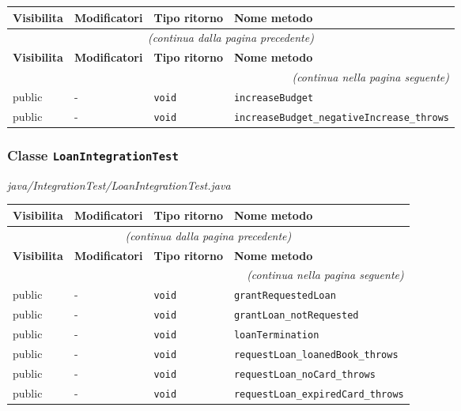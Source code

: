 \begin{longtable}{@{}llll@{}}
\toprule
\textbf{Visibilita} & \textbf{Modificatori} & \textbf{Tipo ritorno} & \textbf{Nome metodo} \\
\midrule
\endfirsthead
\multicolumn{4}{c}{\small\itshape (continua dalla pagina precedente)} \\
\toprule
\textbf{Visibilita} & \textbf{Modificatori} & \textbf{Tipo ritorno} & \textbf{Nome metodo} \\
\midrule
\endhead
\midrule
\multicolumn{4}{r}{\small\itshape (continua nella pagina seguente)} \\
\endfoot
\bottomrule
\endlastfoot
  public & - & \texttt{void} & \texttt{increaseBudget} \\
  public & - & \texttt{void} & \texttt{increaseBudget\_negativeIncrease\_throws} \\
\end{longtable}

\subsubsection*{Classe \texttt{LoanIntegrationTest}}\label{LoanIntegrationTest}
{\small\textit{java/IntegrationTest/LoanIntegrationTest.java}}
\vspace{4pt}

\begin{longtable}{@{}llll@{}}
\toprule
\textbf{Visibilita} & \textbf{Modificatori} & \textbf{Tipo ritorno} & \textbf{Nome metodo} \\
\midrule
\endfirsthead
\multicolumn{4}{c}{\small\itshape (continua dalla pagina precedente)} \\
\toprule
\textbf{Visibilita} & \textbf{Modificatori} & \textbf{Tipo ritorno} & \textbf{Nome metodo} \\
\midrule
\endhead
\midrule
\multicolumn{4}{r}{\small\itshape (continua nella pagina seguente)} \\
\endfoot
\bottomrule
\endlastfoot
  public & - & \texttt{void} & \texttt{grantRequestedLoan} \\
  public & - & \texttt{void} & \texttt{grantLoan\_notRequested} \\
  public & - & \texttt{void} & \texttt{loanTermination} \\
  public & - & \texttt{void} & \texttt{requestLoan\_loanedBook\_throws} \\
  public & - & \texttt{void} & \texttt{requestLoan\_noCard\_throws} \\
  public & - & \texttt{void} & \texttt{requestLoan\_expiredCard\_throws} \\
\end{longtable}

